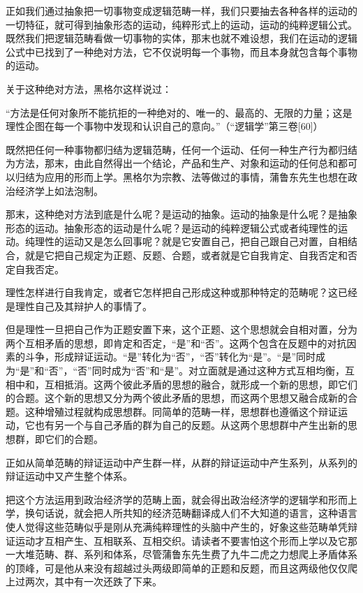 \documentclass[a4paper,twoside,12pt]{ctexart}
\begin{document}
正如我们通过抽象把一切事物变成逻辑范畴一样，我们只要抽去各种各样的运动的一切特征，就可得到抽象形态的运动，纯粹形式上的运动，运动的纯粹逻辑公式。既然我们把逻辑范畴看做一切事物的实体，那末也就不难设想，我们在运动的逻辑公式中已找到了一种绝对方法，它不仅说明每一个事物，而且本身就包含每个事物的运动。

关于这种绝对方法，黑格尔这样说过：

\begin{fangsong}
    “方法是任何对象所不能抗拒的一种绝对的、唯一的、最高的、无限的力量；这是理性企图在每一个事物中发现和认识自己的意向。”（“逻辑学”第三卷[60]）
\end{fangsong}

既然把任何一种事物都归结为逻辑范畴，任何一个运动、任何一种生产行为都归结为方法，那末，由此自然得出一个结论，产品和生产、对象和运动的任何总和都可以归结为应用的形而上学。黑格尔为宗教、法等做过的事情，蒲鲁东先生也想在政治经济学上如法泡制。

那末，这种绝对方法到底是什么呢？是运动的抽象。运动的抽象是什么呢？是抽象形态的运动。抽象形态的运动是什么呢？是运动的纯粹逻辑公式或者纯理性的运动。纯理性的运动又是怎么回事呢？就是它安置自己，把自己跟自己对置，自相结合，就是它把自己规定为正题、反题、合题，或者就是它自我肯定、自我否定和否定自我否定。

理性怎样进行自我肯定，或者它怎样把自己形成这种或那种特定的范畴呢？这已经是理性自己及其辩护人的事情了。

但是理性一旦把自己作为正题安置下来，这个正题、这个思想就会自相对置，分为两个互相矛盾的思想，即肯定和否定，“是”和“否”。这两个包含在反题中的对抗因素的斗争，形成辩证运动。“是”转化为“否”，“否”转化为“是”。“是”同时成为“是”和“否”，“否”同时成为“否”和“是”。对立面就是通过这种方式互相均衡，互相中和，互相抵消。这两个彼此矛盾的思想的融合，就形成一个新的思想，即它们的合题。这个新的思想又分为两个彼此矛盾的思想，而这两个思想又融合成新的合题。这种增殖过程就构成思想群。同简单的范畴一样，思想群也遵循这个辩证运动，它也有另一个与自己矛盾的群为自己的反题。从这两个思想群中产生出新的思想群，即它们的合题。

正如从简单范畴的辩证运动中产生群一样，从群的辩证运动中产生系列，从系列的辩证运动中又产生整个体系。

把这个方法运用到政治经济学的范畴上面，就会得出政治经济学的逻辑学和形而上学，换句话说，就会把人所共知的经济范畴翻译成人们不大知道的语言，这种语言使人觉得这些范畴似乎是刚从充满纯粹理性的头脑中产生的，好象这些范畴单凭辩证运动才互相产生、互相联系、互相交织。请读者不要害怕这个形而上学以及它那一大堆范畴、群、系列和体系，尽管蒲鲁东先生费了九牛二虎之力想爬上矛盾体系的顶峰，可是他从来没有超越过头两级即简单的正题和反题，而且这两级他仅仅爬上过两次，其中有一次还跌了下来。
\end{document}
